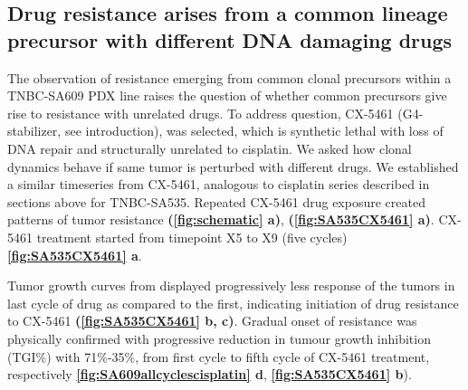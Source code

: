 
\subsection{Drug resistance arises from a common lineage precursor with different DNA damaging drugs}
The observation of resistance emerging from common clonal precursors within a TNBC-SA609 PDX line raises the question of whether common precursors give rise to resistance with unrelated drugs. To address question, CX-5461 (G4-stabilizer, see introduction), was selected, which is synthetic lethal with loss of DNA repair and structurally unrelated to cisplatin. We asked how clonal dynamics behave if same tumor is perturbed with different drugs. 
 We established a similar timeseries from CX-5461, analogous to cisplatin series described in sections above for TNBC-SA535. Repeated CX-5461 drug exposure created patterns of tumor resistance \textbf{(\autoref{fig:schematic} a)},  \textbf{(\autoref{fig:SA535CX5461} a)}. CX-5461 treatment started from timepoint X5 to X9 (five cycles) \textbf{\autoref{fig:SA535CX5461} a}. 
 
Tumor growth curves from displayed progressively less response of the tumors in last cycle of drug as compared to the first, indicating initiation of drug resistance to CX-5461 \textbf{(\autoref{fig:SA535CX5461} b, c)}. 
Gradual onset of resistance was physically confirmed with progressive reduction in tumour growth inhibition (TGI\%) with 71\%-35\%, from first cycle to fifth cycle of CX-5461 treatment, respectively \textbf{\autoref{fig:SA609allcyclescisplatin} d}, \textbf{\autoref{fig:SA535CX5461} b}). 
 


